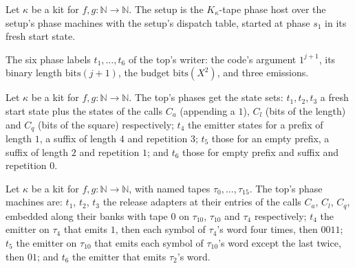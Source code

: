 \begin{definition}
\label{Turing.NTimeDiag.qySet}
\leanok
{}
Let $\kappa$ be a kit for $f, g : \mathbb{N} \to \mathbb{N}$. The setup is the $K_\kappa$-tape phase
host over the setup's phase machines with the setup's dispatch table, started at phase $s_1$ in its
fresh start state.
\end{definition}

\begin{definition}
\label{Turing.NTimeDiag.QyTK}
\leanok
The six phase labels $t_1, \dots, t_6$ of the top's writer: the code's argument $1^{j+1}$, its
binary length $\mathrm{bits}(j + 1)$, the budget $\mathrm{bits}(X^2)$, and three emissions.
\end{definition}

\begin{definition}
\label{Turing.NTimeDiag.QyTPh}
\leanok
{}
Let $\kappa$ be a kit for $f, g : \mathbb{N} \to \mathbb{N}$. The top's phases get the state sets:
$t_1, t_2, t_3$ a fresh start state plus the states of the calls $C_a$ (appending a $1$), $C_l$
(bits of the length) and $C_q$ (bits of the square) respectively; $t_4$ the emitter states for a
prefix of length $1$, a suffix of length $4$ and repetition $3$; $t_5$ those for an empty prefix,
a suffix of length $2$ and repetition $1$; and $t_6$ those for empty prefix and suffix and
repetition $0$.
\end{definition}

\begin{definition}
\label{Turing.NTimeDiag.qyTopM}
\leanok
{}
Let $\kappa$ be a kit for $f, g : \mathbb{N} \to \mathbb{N}$, with named tapes $\tau_0, \dots,
\tau_{15}$. The top's phase machines are: $t_1$, $t_2$, $t_3$ the release adapters at their entries
of the calls $C_a$, $C_l$, $C_q$, embedded along their banks with tape $0$ on $\tau_{10}$,
$\tau_{10}$ and $\tau_4$ respectively; $t_4$ the emitter on $\tau_4$ that emits $1$, then each
symbol of $\tau_4$'s word four times, then $0011$; $t_5$ the emitter on $\tau_{10}$ that emits each
symbol of $\tau_{10}$'s word except the last twice, then $01$; and $t_6$ the emitter that emits
$\tau_2$'s word.
\end{definition}

